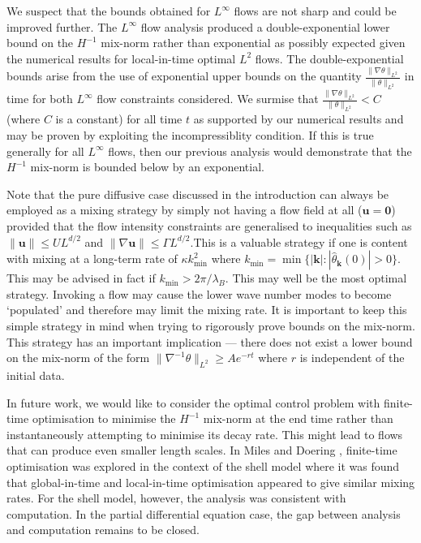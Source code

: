 \documentclass[12pt]{iopart}
\newcommand{\hmone}[1]{\|\nabla^{-1} #1\|_{L^{2}}}
\newcommand{\ltwo}[1]{\|#1\|_{L^{2}}}
\newcommand{\hone}[1]{\| \nabla #1\|_{L^{2}}}
\renewcommand{\vec}[1]{\mathbf{#1}}
\begin{document}
We suspect that the bounds obtained for $L^{\infty}$ flows are not sharp and could be improved further. The $L^{\infty}$ flow analysis produced a double-exponential lower bound on the $H^{-1}$ mix-norm rather than exponential as possibly expected given the numerical results for local-in-time optimal $L^2$ flows. The double-exponential bounds arise from the use of exponential upper bounds on the quantity $\frac{\hone{\theta}}{\ltwo{\theta}}$ in time for both $L^{\infty}$ flow constraints considered. We surmise that $\frac{\hone{\theta}}{\ltwo{\theta}} < C$ (where $C$ is a constant) for all time $t$ as supported by our numerical results and may be proven by exploiting the incompressiblity condition. If this is true generally for all $L^{\infty}$  flows, then our previous analysis would demonstrate that the $H^{-1}$ mix-norm is bounded below by an exponential.

Note that the pure diffusive case discussed in the introduction can always be employed as a mixing strategy by simply not having a flow field at all ($\vec{u} =\vec{0}$) provided that the flow intensity constraints are generalised to inequalities such as $\|\vec{u}\| \leq UL^{d/2}$ and $\|\nabla \vec{u}\| \leq \Gamma L^{d/2}$.This is a valuable strategy if one is content with mixing at a long-term rate of $\kappa k_{\min}^2$ where $k_{\min} = \min \{ |\vec{k}|  :  |\hat{\theta}_{\vec{k}}(0)| > 0  \}$. This may be advised in fact if $k_{\min} > 2 \pi / \lambda_{B}$. This may well be the most optimal strategy. Invoking a flow may cause the lower wave number modes to become `populated' and therefore may limit the mixing rate. It is important to keep this simple strategy in mind when trying to rigorously prove bounds on the mix-norm. This strategy has an important implication --- there does not exist a lower bound on the mix-norm of the form $\hmone{\theta} \geq A e^{-rt}$ where  $r$ is independent of the initial data.

In future work, we would like to consider the optimal control problem with finite-time optimisation to minimise the $H^{-1}$ mix-norm at the end time rather than instantaneously attempting to minimise its decay rate. This might lead to flows that can produce even smaller length scales. In Miles and Doering \cite{Miles2017a}, finite-time optimisation was explored in the context of the shell model where it was found that global-in-time and local-in-time optimisation appeared to give similar mixing rates. For the shell model, however, the analysis was consistent with computation. In the partial differential equation case, the gap between analysis and computation remains to be closed.
\end{document}
